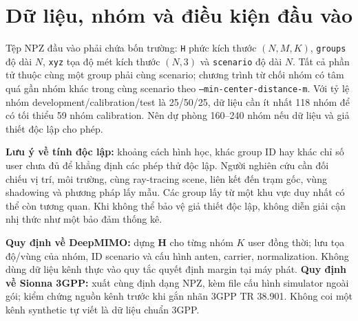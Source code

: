 \documentclass[onecolumn,11pt]{IEEEtran}
\begin{document}
\section{Dữ liệu, nhóm và điều kiện đầu vào}
Tệp NPZ đầu vào phải chứa bốn trường: \texttt{H} phức kích thước $(N,M,K)$, \texttt{groups} độ dài $N$, \texttt{xyz} tọa độ mét kích thước $(N,3)$ và \texttt{scenario} độ dài $N$. Tất cả phần tử thuộc cùng một group phải cùng scenario; chương trình từ chối nhóm có tâm quá gần nhóm khác trong cùng scenario theo \texttt{--min-center-distance-m}. Với tỷ lệ nhóm development/calibration/test là 25/50/25, dữ liệu cần ít nhất 118 nhóm để có tối thiểu 59 nhóm calibration. Nên dự phòng 160--240 nhóm nếu dữ liệu và giả thiết độc lập cho phép.

\textbf{Lưu ý về tính độc lập:} khoảng cách hình học, khác group ID hay khác chỉ số user chưa đủ để khẳng định các phép thử độc lập. Người nghiên cứu cần đối chiếu vị trí, môi trường, cùng ray-tracing scene, liên kết đến trạm gốc, vùng shadowing và phương pháp lấy mẫu. Các group lấy từ một khu vực duy nhất có thể còn tương quan. Khi không thể bảo vệ giả thiết độc lập, không diễn giải cận nhị thức như một bảo đảm thống kê.

\textbf{Quy định về DeepMIMO:} dựng $\mathbf H$ cho từng nhóm $K$ user đồng thời; lưu tọa độ/vùng của nhóm, ID scenario và cấu hình anten, carrier, normalization. Không dùng dữ liệu kênh thực vào quy tắc quyết định margin tại máy phát. \textbf{Quy định về Sionna 3GPP:} xuất cùng định dạng NPZ, kèm file cấu hình simulator ngoài gói; kiểm chứng nguồn kênh trước khi gắn nhãn 3GPP TR 38.901. Không coi một kênh synthetic tự viết là dữ liệu chuẩn 3GPP.
\end{document}
